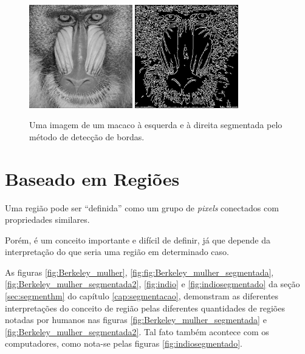 \begin{figure}[!htb]
 \centering
 \def\baselinestretch{1}\small\normalsize
 \includegraphics[width=0.4\textwidth]{img/stf-smandrill.jpg}\qquad
 \includegraphics[width=0.4\textwidth]{img/stf-smandrill-edgedetect.jpg} 
 \caption{\label{fig:smandrill} Uma imagem de um macaco \citep{stanford} à esquerda e à direita segmentada pelo método de detecção de bordas.}
\end{figure}


\section{Baseado em Regiões}
Uma região pode ser “definida” como um grupo de \textit{pixels} conectados com propriedades similares.

Porém, é um conceito importante e difícil de definir, já que depende da interpretação do que seria uma região  em determinado caso.

As figuras \ref{fig:Berkeley_mulher}, \ref{fig:fig:Berkeley_mulher_segmentada}, \ref{fig:Berkeley_mulher_segmentada2}, \ref{fig:indio} e \ref{fig:indiosegmentado} da seção \ref{sec:segmenthm} do capítulo \ref{cap:segmentacao}, demonstram as diferentes interpretações do conceito de região pelas diferentes quantidades de regiões notadas por humanos nas figuras \ref{fig:Berkeley_mulher_segmentada} e \ref{fig:Berkeley_mulher_segmentada2}. Tal fato também acontece com os computadores, como nota-se pelas figuras \ref{fig:indiosegmentado}.

